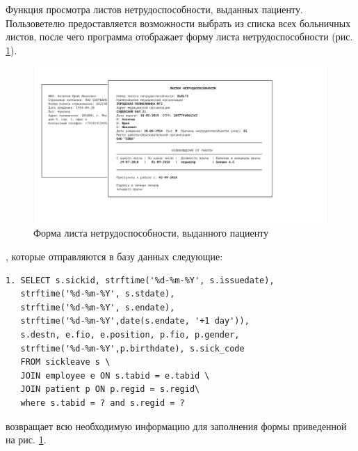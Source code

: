 \documentclass[14pt,a4paper,russian]{extreport}
\begin{document}
Функция просмотра листов нетрудоспособности, выданных пациенту. Пользоветелю предоставляется возможности выбрать из списка всех больничных листов, после чего программа отображает форму листа нетрудоспособности (рис. \ref{fig:sickleave-form}).\par
\begin{figure}[h!]
        \includegraphics[width=\textwidth]{prog_int/sickleave-view}
        \caption{Форма листа нетрудоспособности, выданного пациенту}
        \label{fig:sickleave-form}
\end{figure}
, которые отправляются в базу данных следующие: 
\begin{lstlisting}[style=csql] 
1. SELECT s.sickid, strftime('%d-%m-%Y', s.issuedate),
   strftime('%d-%m-%Y', s.stdate), 
   strftime('%d-%m-%Y', s.endate),
   strftime('%d-%m-%Y',date(s.endate, '+1 day')), 
   s.destn, e.fio, e.position, p.fio, p.gender,
   strftime('%d-%m-%Y',p.birthdate), s.sick_code
   FROM sickleave s \
   JOIN employee e ON s.tabid = e.tabid \
   JOIN patient p ON p.regid = s.regid\
   where s.tabid = ? and s.regid = ?
\end{lstlisting}
\noindentЗапрос возвращает всю необходимую информацию для заполнения формы приведенной на рис. \ref{fig:sickleave-form}.
\end{document}
